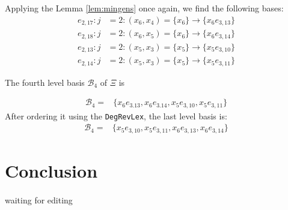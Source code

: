 \documentclass{article}
\theoremstyle{definition}
\theoremstyle{remark}
\theoremstyle{example}
\begin{document}
Applying the Lemma \ref{lem:mingens} once again, we find the following bases:
\begin{align}
    e_{2,17}: j &= 2: (x_6,x_4) = \{x_6\} \rightarrow\{x_6e_{3,13}\}\\
    e_{2,18}: j &= 2: (x_6,x_5) = \{x_6\} \rightarrow\{x_6e_{3,14}\}\\
    e_{2,13}: j &= 2: (x_5,x_3) = \{x_5\} \rightarrow\{x_5e_{3,10}\}\\
    e_{2,14}: j &= 2: (x_5,x_3) = \{x_5\} \rightarrow\{x_5e_{3,11}\}
\end{align}

The fourth level basis $\mathcal{B}_4$ of $\Xi$ is

\begin{equation}
    \begin{aligned}
        \mathcal{B}_4 = &\{x_6e_{3.13},x_6e_{3.14},x_5e_{3,10},x_5e_{3,11}\}
    \end{aligned}
\end{equation}
After ordering it using the \verb+DegRevLex+, the last level basis is:
\begin{equation}
    \begin{aligned}
        \mathcal{B}_4 = &\{x_5e_{3,10},x_5e_{3,11},x_6e_{3,13},x_6e_{3,14}\}
    \end{aligned}
\end{equation}

\section{Conclusion}

\paragraph{  }

\textcolor{BrickRed}{waiting for editing}

\newpage
\printbibliography
\end{document}
